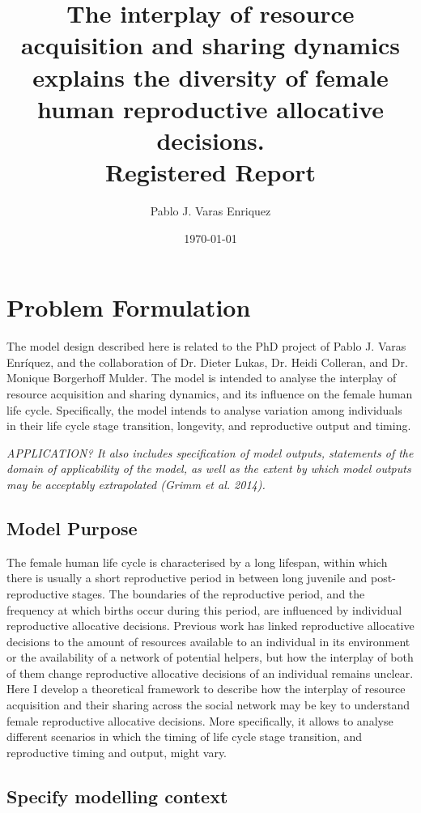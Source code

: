 \documentclass{article}
\title{The interplay of resource acquisition and sharing dynamics explains the diversity of female human reproductive allocative decisions.
\\
Registered Report}
\author{Pablo J. Varas Enriquez}
\date{\today}
\begin{document}
\maketitle

\tableofcontents

\section{Problem Formulation}

The model design described here is related to the PhD project of Pablo J. Varas Enríquez, and the collaboration of Dr. Dieter Lukas, Dr. Heidi Colleran, and Dr. Monique Borgerhoff Mulder. The model is intended to analyse the interplay of resource acquisition and sharing dynamics, and its influence on the female human life cycle. Specifically, the model intends to analyse variation among individuals in their life cycle stage transition, longevity, and reproductive output and timing.

\emph{APPLICATION? It also includes specification of model outputs, statements of the domain of applicability of the model, as well as the extent by which model outputs may be acceptably extrapolated (Grimm et al. 2014).}

\subsection{Model Purpose}

The female human life cycle is characterised by a long lifespan, within which there is usually a short reproductive period in between long juvenile and post-reproductive stages. The boundaries of the reproductive period, and the frequency at which births occur during this period, are influenced by individual reproductive allocative decisions. Previous work has linked reproductive allocative decisions to the amount of resources available to an individual in its environment or the availability of a network of potential helpers, but how the interplay of both of them change reproductive allocative decisions of an individual remains unclear. Here I develop a theoretical framework to describe how the interplay of resource acquisition and their sharing across the social network may be key to understand female reproductive allocative decisions. More specifically, it allows to analyse different scenarios in which the timing of life cycle stage transition, and reproductive timing and output, might vary.

\subsection{Specify modelling context}
\end{document}
